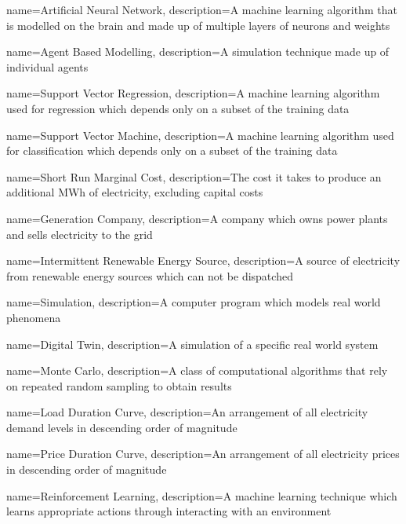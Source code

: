 {
        name=Artificial Neural Network,
        description={A machine learning algorithm that is modelled on the brain and made up of multiple layers of neurons and weights}
}

{
        name=Agent Based Modelling,
        description={A simulation technique made up of individual agents}
}

{
        name=Support Vector Regression,
        description={A machine learning algorithm used for regression which depends only on a subset of the training data}
}



{
	name=Support Vector Machine,
	description={A machine learning algorithm used for classification which depends only on a subset of the training data}
}

{
	name=Short Run Marginal Cost,
	description={The cost it takes to produce an additional MWh of electricity, excluding capital costs}
}

{
	name=Generation Company,
	description={A company which owns power plants and sells electricity to the grid}
}

{
	name=Intermittent Renewable Energy Source,
	description={A source of electricity from renewable energy sources which can not be dispatched}
}

{
	name=Simulation,
	description={A computer program which models real world phenomena}
}

{
	name=Digital Twin,
	description={A simulation of a specific real world system}
}

{
	name=Monte Carlo,
	description={A class of computational algorithms that rely on repeated random sampling to obtain results}
}

{
	name=Load Duration Curve,
	description={An arrangement of all electricity demand levels in descending order of magnitude}
}

{
	name=Price Duration Curve,
	description={An arrangement of all electricity prices in descending order of magnitude}
}


{
	name=Reinforcement Learning,
	description={A machine learning technique which learns appropriate actions through interacting with an environment}
}

